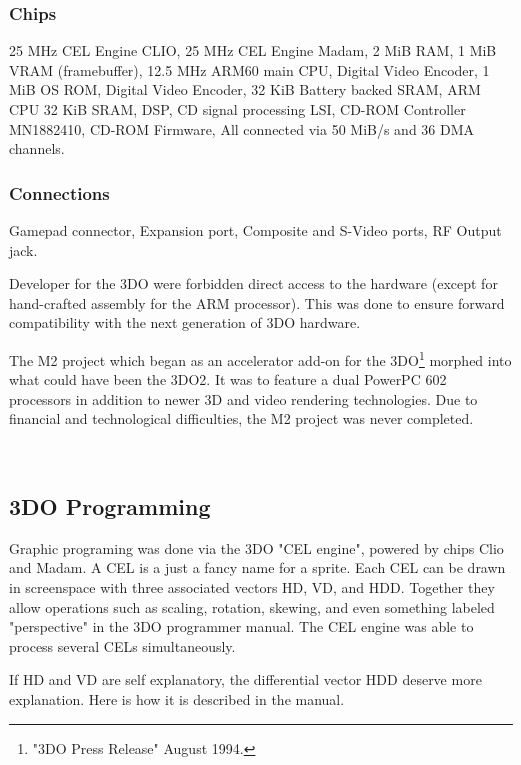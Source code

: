 \subsubsection{Chips}
 25 MHz CEL Engine CLIO, 
 25 MHz CEL Engine  Madam, 
 2 MiB RAM, 
 1 MiB VRAM (framebuffer), 
 12.5 MHz ARM60 main CPU, 
 Digital Video Encoder, 
 1 MiB OS ROM, 
 Digital Video Encoder, 
 32 KiB Battery backed SRAM,  
 ARM CPU 32 KiB SRAM, 
 DSP, 
 CD signal processing LSI, 
 CD-ROM Controller MN1882410, 
 CD-ROM Firmware, All connected via 50 MiB/s and 36 DMA channels.
\subsubsection{Connections}
 Gamepad connector,
 Expansion port,
 Composite and S-Video ports, 
 RF Output jack. 


\par
Developer for the 3DO were forbidden direct access to the hardware (except for hand-crafted assembly for the ARM processor). This was done to ensure forward compatibility with the next generation of 3DO hardware.\\
\par
 The M2 project which began as an accelerator add-on for the 3DO\footnote{"3DO Press Release" August 1994.} morphed into what could have been the 3DO2. It was to feature a dual PowerPC 602 processors in addition to newer 3D and video rendering technologies. Due to financial and technological difficulties, the M2 project was never completed.\\
\par
{}\\
\pagebreak

\subsection{3DO Programming}
Graphic programing was done via the 3DO "CEL engine", powered by chips Clio and Madam. A CEL is a just a fancy name for a sprite. Each CEL can be drawn in screenspace with three associated vectors HD, VD, and HDD. Together they allow operations such as scaling, rotation, skewing, and even something labeled "perspective" in the 3DO programmer manual. The CEL engine was able to process several CELs simultaneously.\\
\par
If HD and VD are self explanatory, the differential vector HDD deserve more explanation. Here is how it is described in the manual.\\

